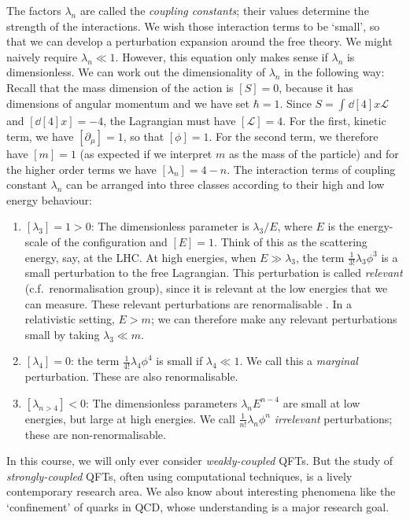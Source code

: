The factors $\lambda_n$ are called the \emph{coupling constants}; their values determine the strength of the interactions.
We wish those interaction terms to be `small', so that we can develop a perturbation expansion around the free theory.
We might naively require $\lambda_n \ll 1$. However, this equation only makes sense if $\lambda_n$ is dimensionless.
We can work out the dimensionality of $\lambda_n$ in the following way:
Recall that the mass dimension of the action is $[S] = 0$, because it has dimensions of angular momentum and we have set $\hbar = 1$. Since $S = \int_{}^{} \dd[4]{x} \mathcal{L}$ and $[\dd[4]{x}] = -4$, the Lagrangian must have $[\mathcal{L}] = 4$.
For the first, kinetic term, we have $[\partial_\mu] = 1$, so that $[\phi] = 1$.
For the second term, we therefore have $[m] = 1$ (as expected if we interpret $m$ as the mass of the particle) and for the higher order terms we have $[\lambda_n] = 4-n$.
The interaction terms of coupling constant $\lambda_n$ can be arranged into three classes according to their high and low energy behaviour:
\begin{enumerate}
  \item $[\lambda_3] = 1 > 0$: The dimensionless parameter is $\lambda_3 / E$, where $E$ is the energy-scale of the configuration and $[E] = 1$. Think of this as the scattering energy, say, at the LHC.
    At high energies, when $E \gg \lambda_3$, the term $\frac{1}{3!}\lambda_3 \phi^3$ is a small perturbation to the free Lagrangian.
    This perturbation is called \emph{relevant} (c.f.~renormalisation group), since it is relevant at the low energies that we can measure. These relevant perturbations are renormalisable .
    In a relativistic setting, $E > m$; we can therefore make any relevant perturbations small by taking $\lambda_3 \ll m$.
  \item $[\lambda_4] = 0$: the term $\frac{1}{4!}\lambda_4 \phi^4$ is small if $\lambda_4 \ll 1$. We call this a \emph{marginal} perturbation. These are also renormalisable.
  \item $[\lambda_{n > 4}] < 0$: The dimensionless parameters $\lambda_n E^{n-4}$ are small at low energies, but large at high energies. We call $\frac{1}{n!} \lambda_n \phi^n$ \emph{irrelevant} perturbations; these are non-renormalisable.
\end{enumerate}
In this course, we will only ever consider \emph{weakly-coupled} QFTs.
But the study of \emph{strongly-coupled} QFTs, often using computational techniques, is a lively contemporary research area.
We also know about interesting phenomena like the `confinement' of quarks in QCD, whose understanding is a major research goal.

